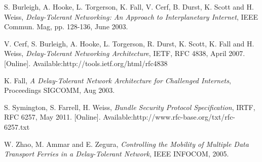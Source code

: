 \documentclass[11pt,a4paper]{article}
\begin{document}
\begin{thebibliography}{9}
  S. Burleigh, A. Hooke, L. Torgerson, K. Fall, V. Cerf, B. Durst, K. Scott and H. Weiss,
  \emph{Delay-Tolerant Networking: An Approach to Interplanetary Internet},
  IEEE Commun. Mag,
  pp. 128-136,
  June 2003.
 
  V. Cerf, S. Burleigh, A. Hooke, L. Torgerson, R. Durst, K. Scott, K. Fall and H. Weiss,
  \emph{Delay-Tolerant Networking Architecture},
  IETF,
  RFC 4838,
  April 2007.
  [Online]. Available:http://tools.ietf.org/html/rfc4838

  K. Fall,
  \emph{A Delay-Tolerant Network Architecture for Challenged Internets},
  Proceedings SIGCOMM,
  Aug 2003.
  
  S. Symington, S. Farrell, H. Weiss,
  \emph{Bundle Security Protocol Specification},
  IRTF,
  RFC 6257,
  May 2011.
  [Online]. Available:http://www.rfc-base.org/txt/rfc-6257.txt

  W. Zhao, M. Ammar and E. Zegura,
  \emph{Controlling the Mobility of Multiple Data Transport Ferries in a Delay-Tolerant Network},
  IEEE INFOCOM,
  2005.

\end{thebibliography}
\end{document}
